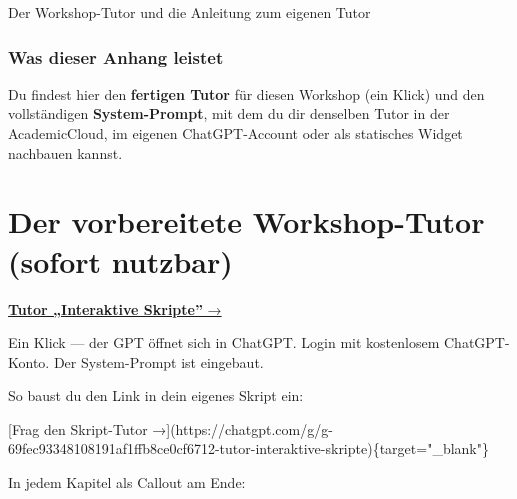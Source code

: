 \documentclass[
  ngerman,
  a4paper,
  DIV=11]{scrreprt}
\newenvironment{Shaded}{\begin{snugshade}}{\end{snugshade}}
\newcommand{\CommentTok}[1]{\textcolor[rgb]{0.37,0.37,0.37}{#1}}
\newcommand{\NormalTok}[1]{\textcolor[rgb]{0.00,0.23,0.31}{#1}}
\newcommand{\OtherTok}[1]{\textcolor[rgb]{0.00,0.23,0.31}{#1}}
\begin{document}
Der Workshop-Tutor und die Anleitung zum eigenen Tutor

\hfill\break

\subsubsection{Was dieser Anhang
leistet}\label{was-dieser-anhang-leistet-1}

Du findest hier den \textbf{fertigen Tutor} für diesen Workshop (ein
Klick) und den vollständigen \textbf{System-Prompt}, mit dem du dir
denselben Tutor in der AcademicCloud, im eigenen ChatGPT-Account oder
als statisches Widget nachbauen kannst.

\section{Der vorbereitete Workshop-Tutor (sofort
nutzbar)}\label{der-vorbereitete-workshop-tutor-sofort-nutzbar}

\begin{tcolorbox}[enhanced jigsaw, opacitybacktitle=0.6, leftrule=.75mm, title=\textcolor{quarto-callout-tip-color}{\faLightbulb}\hspace{0.5em}{Tutor öffnen}, colframe=quarto-callout-tip-color-frame, arc=.35mm, toprule=.15mm, colbacktitle=quarto-callout-tip-color!10!white, bottomrule=.15mm, colback=white, rightrule=.15mm, breakable, toptitle=1mm, bottomtitle=1mm, opacityback=0, titlerule=0mm, coltitle=black, left=2mm]

\href{https://chatgpt.com/g/g-69fec93348108191af1ffb8ce0cf6712-tutor-interaktive-skripte}{\textbf{Tutor
„Interaktive Skripte''} →}

Ein Klick --- der GPT öffnet sich in ChatGPT. Login mit kostenlosem
ChatGPT-Konto. Der System-Prompt ist eingebaut.

\end{tcolorbox}

So baust du den Link in dein eigenes Skript ein:

\begin{Shaded}
\begin{Highlighting}[]
\CommentTok{[}\OtherTok{Frag den Skript{-}Tutor →}\CommentTok{](https://chatgpt.com/g/g{-}69fec93348108191af1ffb8ce0cf6712{-}tutor{-}interaktive{-}skripte)}\NormalTok{\{target="\_blank"\}}
\end{Highlighting}
\end{Shaded}

In jedem Kapitel als Callout am Ende:
\end{document}
